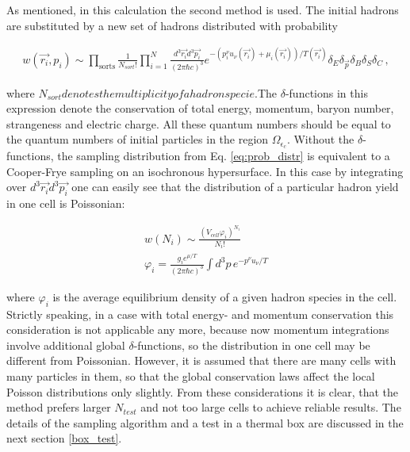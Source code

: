 As mentioned, in this calculation the second method is used. The initial
hadrons are substituted by a new set of hadrons distributed with probability

\begin{eqnarray} \label{eq:prob_distr}
  w(\vec{r_i},p_{i}) \sim \prod_{\mathrm{sorts}}\frac{1}{N_{sort}!}
   \prod_{i=1}^N \frac{d^3 \vec{r_i} d^3\vec{p_i}}{(2\pi\hbar c)^3}
   e^{-(p^{\nu}_i u_{\nu}(\vec{r_i}) + \mu_i(\vec{r_i}))/T(\vec{r_i})}
   \delta_E \delta_{\vec{p}} \delta_B \delta_S \delta_C \,,
\end{eqnarray}

where $N_{sort} denotes the multiplicity of a hadron specie.
$The $\delta$-functions in this expression denote the conservation of total
energy, momentum, baryon number, strangeness and electric charge. All these
quantum numbers should be equal to the quantum numbers of initial particles in
the region $\Omega_{\epsilon_c}$. Without the $\delta$-functions, the sampling
distribution from Eq. \ref{eq:prob_distr} is equivalent to a Cooper-Frye
sampling on an isochronous hypersurface. In this case by integrating over $d^3
\vec{r_i} d^3\vec{p_i}$ one can easily see that the distribution of a
particular hadron yield in one cell is Poissonian:

\begin{eqnarray}
\label{eq:pois}
  w(N_{i}) \sim \frac{(V_{cell}\varphi_i)^{N_i}}{N_i!} \\
  \varphi_i = \frac{g_i e^{\mu/T}}{(2\pi\hbar c)^3}\int d^3p \, e^{-p^{\nu} u_{\nu}/T}
\end{eqnarray}

where $\varphi_i$ is the average equilibrium density of a given hadron species
in the cell. Strictly speaking, in a case with total energy- and momentum
conservation this consideration is not applicable any more, because now
momentum integrations involve additional global $\delta$-functions, so the
distribution in one cell may be different from Poissonian. However, it is assumed
that there are many cells with many particles in them, so that the global
conservation laws affect the local Poisson distributions only slightly. From
these considerations it is clear, that the method prefers larger $N_{test}$ and
not too large cells to achieve reliable results. The details of the sampling
algorithm and a test in a thermal box are discussed in the next section
\ref{box_test}.

